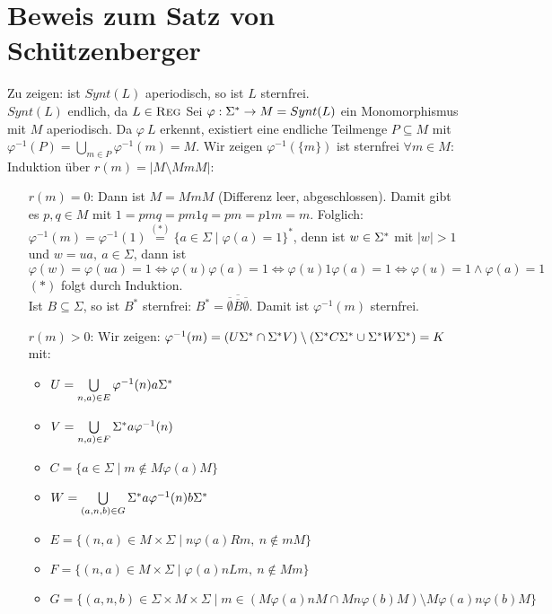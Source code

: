 \section{Beweis zum Satz von Schützenberger}
    Zu zeigen: ist $Synt(L)$ aperiodisch, so ist $L$ sternfrei.\\
    $Synt(L)$ endlich, da $L\in \textsc{Reg}$
    Sei $\varphi:\Sigma^*\rightarrow M=Synt(L)$ ein Monomorphismus mit $M$ aperiodisch. Da $\varphi\ L$ erkennt, existiert eine endliche Teilmenge $P\subseteq M$ mit $\varphi^{-1}(P)=\bigcup\limits_{m\in P}\varphi^{-1}(m)=M$. Wir zeigen $\varphi^{-1}(\{m\})$ ist sternfrei $\forall m\in M$:\\
    Induktion über $r(m)=|M\setminus MmM|$:
    \begin{itemize}
        \item[$r(m)=0$:] Dann ist $M=MmM$ (Differenz leer, abgeschlossen). Damit gibt es $p,q\in M$ mit $1=pmq=pm1q=pm=p1m=m$. Folglich: $\varphi^{-1}(m)=\varphi^{-1}(1)\overset{(*)}{=}\{a\in\Sigma\mid\varphi(a)=1\}^*$, denn ist $w\in \Sigma^*$ mit $|w|>1$ und $w=ua,\ a\in \Sigma$, dann ist $$\varphi(w)=\varphi(ua)=1\Leftrightarrow \varphi(u)\varphi(a)=1\Leftrightarrow \varphi(u)1\varphi(a)=1\Leftrightarrow \varphi(u)=1\wedge \varphi(a)=1$$
        $(*)$ folgt durch Induktion.\\
        Ist $B\subseteq \Sigma$, so ist $B^*$ sternfrei: $B^*=\overline{\overline{\emptyset}\overline{B}\overline{\emptyset}}$. Damit ist $\varphi^{-1}(m)$ sternfrei.
        \item[$r(m)>0$:] Wir zeigen: $\varphi^{-1}(m)=(U\Sigma^*\cap \Sigma^* V)\setminus(\Sigma^* C\Sigma^*\cup \Sigma^* W\Sigma^*)=K$ mit:
        \begin{itemize}
            \item $U=\bigcup\limits_{n,a)\in E} \varphi^{-1}(n)a\Sigma^*$
            \item $V=\bigcup\limits_{n,a)\in F} \Sigma^* a\varphi^{-1}(n)$
            \item $C=\{a\in\Sigma\mid m\not\in M\varphi(a)M\}$
            \item $W=\bigcup\limits_{(a,n,b)\in G}\Sigma^* a\varphi^{-1}(n)b\Sigma^*$
            \item $E=\{(n,a)\in M\times \Sigma\mid n\varphi(a)Rm,\ n\not\in mM\}$
            \item $F=\{(n,a)\in M\times \Sigma\mid \varphi(a)nLm,\ n\not\in Mm\}$
            \item $G=\{(a,n,b)\in \Sigma\times M\times \Sigma\mid m\in \left(M\varphi(a)nM\cap Mn\varphi(b)M\right)\setminus M\varphi(a)n\varphi(b)M\}$

\end{itemize}
\end{itemize}
